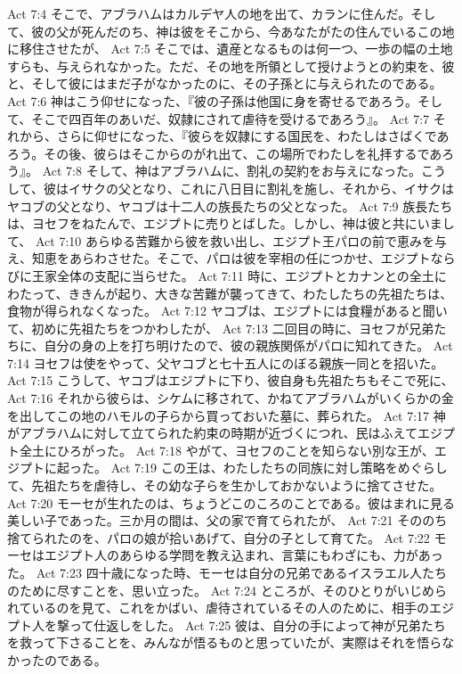 Act 7:4  そこで、アブラハムはカルデヤ人の地を出て、カランに住んだ。そして、彼の父が死んだのち、神は彼をそこから、今あなたがたの住んでいるこの地に移住させたが、
Act 7:5  そこでは、遺産となるものは何一つ、一歩の幅の土地すらも、与えられなかった。ただ、その地を所領として授けようとの約束を、彼と、そして彼にはまだ子がなかったのに、その子孫とに与えられたのである。
Act 7:6  神はこう仰せになった、『彼の子孫は他国に身を寄せるであろう。そして、そこで四百年のあいだ、奴隷にされて虐待を受けるであろう』。
Act 7:7  それから、さらに仰せになった、『彼らを奴隷にする国民を、わたしはさばくであろう。その後、彼らはそこからのがれ出て、この場所でわたしを礼拝するであろう』。
Act 7:8  そして、神はアブラハムに、割礼の契約をお与えになった。こうして、彼はイサクの父となり、これに八日目に割礼を施し、それから、イサクはヤコブの父となり、ヤコブは十二人の族長たちの父となった。
Act 7:9  族長たちは、ヨセフをねたんで、エジプトに売りとばした。しかし、神は彼と共にいまして、
Act 7:10  あらゆる苦難から彼を救い出し、エジプト王パロの前で恵みを与え、知恵をあらわさせた。そこで、パロは彼を宰相の任につかせ、エジプトならびに王家全体の支配に当らせた。
Act 7:11  時に、エジプトとカナンとの全土にわたって、ききんが起り、大きな苦難が襲ってきて、わたしたちの先祖たちは、食物が得られなくなった。
Act 7:12  ヤコブは、エジプトには食糧があると聞いて、初めに先祖たちをつかわしたが、
Act 7:13  二回目の時に、ヨセフが兄弟たちに、自分の身の上を打ち明けたので、彼の親族関係がパロに知れてきた。
Act 7:14  ヨセフは使をやって、父ヤコブと七十五人にのぼる親族一同とを招いた。
Act 7:15  こうして、ヤコブはエジプトに下り、彼自身も先祖たちもそこで死に、
Act 7:16  それから彼らは、シケムに移されて、かねてアブラハムがいくらかの金を出してこの地のハモルの子らから買っておいた墓に、葬られた。
Act 7:17  神がアブラハムに対して立てられた約束の時期が近づくにつれ、民はふえてエジプト全土にひろがった。
Act 7:18  やがて、ヨセフのことを知らない別な王が、エジプトに起った。
Act 7:19  この王は、わたしたちの同族に対し策略をめぐらして、先祖たちを虐待し、その幼な子らを生かしておかないように捨てさせた。
Act 7:20  モーセが生れたのは、ちょうどこのころのことである。彼はまれに見る美しい子であった。三か月の間は、父の家で育てられたが、
Act 7:21  そののち捨てられたのを、パロの娘が拾いあげて、自分の子として育てた。
Act 7:22  モーセはエジプト人のあらゆる学問を教え込まれ、言葉にもわざにも、力があった。
Act 7:23  四十歳になった時、モーセは自分の兄弟であるイスラエル人たちのために尽すことを、思い立った。
Act 7:24  ところが、そのひとりがいじめられているのを見て、これをかばい、虐待されているその人のために、相手のエジプト人を撃って仕返しをした。
Act 7:25  彼は、自分の手によって神が兄弟たちを救って下さることを、みんなが悟るものと思っていたが、実際はそれを悟らなかったのである。

